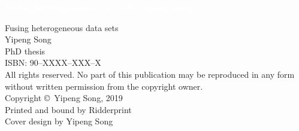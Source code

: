 {\pagestyle{empty}
\newcommand{\printtitle}{%
{\Huge\bf Fusing heterogeneous data sets}}  %

\begin{titlepage}
\pagecolor{hanblue}\afterpage{\nopagecolor}
\par\vskip 2cm
\begin{center}
\Huge\bf \textcolor{white}{Fusing heterogeneous data sets}
\vfill
{\LARGE\bf \textcolor{white}{Yipeng Song}}                           %
\vskip 2cm
\end{center}
\end{titlepage}

\newpage
\noindent%
{
\vfill
\noindent%
Fusing heterogeneous data sets \\
Yipeng Song \\
PhD thesis \\
ISBN: 90--XXXX--XXX--X \\[2ex]     %

\noindent%
All rights reserved. No part of this publication may be reproduced in any form
without written permission from the copyright owner.\\[2ex]

\noindent%
Copyright \copyright\ Yipeng Song, 2019 \\[2ex] %

\noindent%
Printed and bound by Ridderprint\\    %
Cover design by Yipeng Song \\  %
\vskip 2cm
}

}
